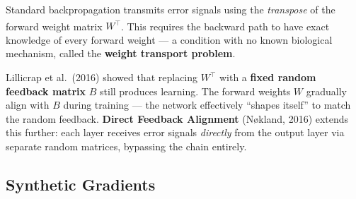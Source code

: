 \begin{tcbitemize}[ skin=sectionraster ]
    \tcbitem[title={The Weight Transport Problem}, raster multicolumn=3]
    Standard backpropagation transmits error signals using the \emph{transpose} of the forward weight matrix $W^\top$\textsuperscript{\cite[][p.~3]{fischerVorlesungGrundlagenNeuronale2024}}.
    This requires the backward path to have exact knowledge of every forward weight --- a condition with no known biological mechanism, called the \textbf{weight transport problem}.

    \tcbitem[title={Feedback Alignment}, raster multicolumn=3]
    Lillicrap et al.\ (2016) showed that replacing $W^\top$ with a \textbf{fixed random feedback matrix} $B$ still produces learning.
    The forward weights $W$ gradually align with $B$ during training --- the network effectively ``shapes itself'' to match the random feedback.
    \textbf{Direct Feedback Alignment} (N{\o}kland, 2016) extends this further: each layer receives error signals \emph{directly} from the output layer via separate random matrices, bypassing the chain entirely.
\end{tcbitemize}

\subsection{Synthetic Gradients}

